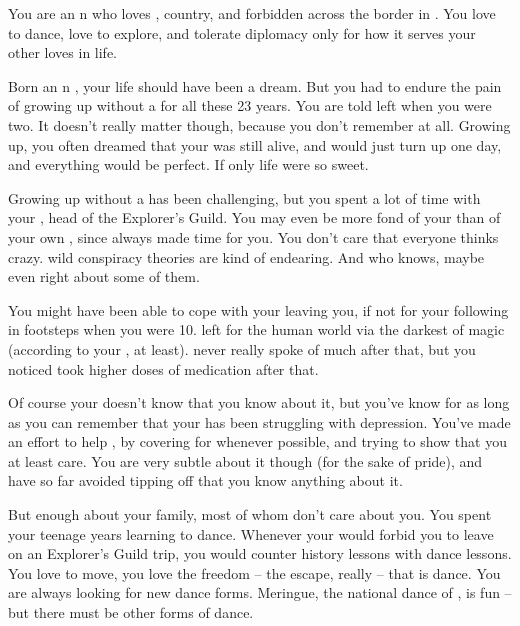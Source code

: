 \documentclass[char]{NeptuneBall}
\begin{document}
\name{\cPrincess{}}


You are an \pAtlantis{}n \cPrincess{\prince} who loves \cPrincess{\their} \cKing{\parent}, \cPrincess{\their} country, and \cPrincess{\their} forbidden \cDiplomat{\paramour} across the border in \pPacifica{}. You love to dance, love to explore, and tolerate diplomacy only for how it serves your other loves in life.

Born an \pAtlantis{}n \cPrincess{\prince}, your life should have been a dream. But you had to endure the pain of growing up without a \cQueen{\parent} for all these 23 years. You are told \cQueen{\they} left when you were two. It doesn't really matter though, because you don't remember \cQueen{\them} at all. Growing up, you often dreamed that your \cQueen{\parent} was still alive, and would just turn up one day, and everything would be perfect. If only life were so sweet.

Growing up without a \cQueen{\parent} has been challenging, but you spent a lot of time with your \cPlant{\uncle} \cPlant{}, head of the Explorer's Guild. You may even be more fond of your \cPlant{\uncle} than of your own \cKing{\parent}, since \cPlant{} always made time for you. You don't care that everyone thinks \cPlant{\they} \cPlant{\are} crazy. \cPlant{\Their} wild conspiracy theories are kind of endearing. And who knows, maybe \cPlant{\they} \cPlant{\are} even right about some of them.

You might have been able to cope with your \cQueen{\parent} leaving you, if not for your \cAriel{\sibling} following in \cQueen{\their} footsteps when you were 10. \cAriel{} left for the human world via the darkest of magic (according to your \cKing{\parent}, at least). \cKing{\They} never really spoke of \cAriel{\them} much after that, but you noticed \cKing{\they} took higher doses of \cKing{\their} medication after that.

Of course your \cKing{\parent} doesn't know that you know about it, but you've know for as long as you can remember that your \cKing{\parent} has been struggling with depression. You've made an effort to help \cKing{\them}, by covering for \cKing{\them} whenever possible, and trying to show \cKing{\them} that you at least care. You are very subtle about it though (for the sake of \cKing{\their} pride), and have so far avoided tipping \cKing{\them} off that you know anything about it.

But enough about your family, most of whom don't care about you. You spent your teenage years learning to dance. Whenever your \cKing{\parent} would forbid you to leave on an Explorer's Guild trip, you would counter \cKing{\them} history lessons with dance lessons.  You love to move, you love the freedom -- the escape, really -- that is dance. You are always looking for new dance forms. Meringue, the national dance of \pAtlantis{}, is fun -- but there must be other forms of dance.
\end{document}
